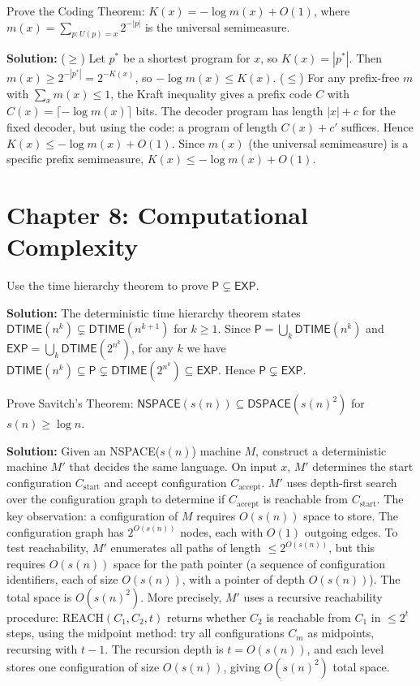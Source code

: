 \begin{exercise}[Challenge]
Prove the Coding Theorem: $K(x) = -\log m(x) + O(1)$, where $m(x) = \sum_{p: U(p)=x} 2^{-|p|}$ is the universal semimeasure.
\end{exercise}
\textbf{Solution:} ($\ge$) Let $p^*$ be a shortest program for $x$, so $K(x) = |p^*|$. Then $m(x) \ge 2^{-|p^*|} = 2^{-K(x)}$, so $-\log m(x) \le K(x)$. ($\le$) For any prefix-free $m$ with $\sum_x m(x) \le 1$, the Kraft inequality gives a prefix code $C$ with $C(x) = \lceil -\log m(x) \rceil$ bits. The decoder program has length $|x| + c$ for the fixed decoder, but using the code: a program of length $C(x) + c'$ suffices. Hence $K(x) \le -\log m(x) + O(1)$. Since $m(x)$ (the universal semimeasure) is a specific prefix semimeasure, $K(x) \le -\log m(x) + O(1)$.

\section{Chapter 8: Computational Complexity}

\begin{exercise}[Basic]
Use the time hierarchy theorem to prove $\mathsf{P} \subsetneq \mathsf{EXP}$.
\end{exercise}
\textbf{Solution:} The deterministic time hierarchy theorem states $\mathsf{DTIME}(n^k) \subsetneq \mathsf{DTIME}(n^{k+1})$ for $k \ge 1$. Since $\mathsf{P} = \bigcup_k \mathsf{DTIME}(n^k)$ and $\mathsf{EXP} = \bigcup_k \mathsf{DTIME}(2^{n^k})$, for any $k$ we have $\mathsf{DTIME}(n^k) \subseteq \mathsf{P} \subsetneq \mathsf{DTIME}(2^{n^k}) \subseteq \mathsf{EXP}$. Hence $\mathsf{P} \subsetneq \mathsf{EXP}$.

\begin{exercise}[Intermediate]
Prove Savitch's Theorem: $\mathsf{NSPACE}(s(n)) \subseteq \mathsf{DSPACE}(s(n)^2)$ for $s(n) \ge \log n$.
\end{exercise}
\textbf{Solution:} Given an NSPACE($s(n)$) machine $M$, construct a deterministic machine $M'$ that decides the same language. On input $x$, $M'$ determines the start configuration $C_{\mathrm{start}}$ and accept configuration $C_{\mathrm{accept}}$. $M'$ uses depth-first search over the configuration graph to determine if $C_{\mathrm{accept}}$ is reachable from $C_{\mathrm{start}}$. The key observation: a configuration of $M$ requires $O(s(n))$ space to store. The configuration graph has $2^{O(s(n))}$ nodes, each with $O(1)$ outgoing edges. To test reachability, $M'$ enumerates all paths of length $\le 2^{O(s(n))}$, but this requires $O(s(n))$ space for the path pointer (a sequence of configuration identifiers, each of size $O(s(n))$, with a pointer of depth $O(s(n))$). The total space is $O(s(n)^2)$. More precisely, $M'$ uses a recursive reachability procedure: $\mathrm{REACH}(C_1, C_2, t)$ returns whether $C_2$ is reachable from $C_1$ in $\le 2^t$ steps, using the midpoint method: try all configurations $C_m$ as midpoints, recursing with $t-1$. The recursion depth is $t = O(s(n))$, and each level stores one configuration of size $O(s(n))$, giving $O(s(n)^2)$ total space.

